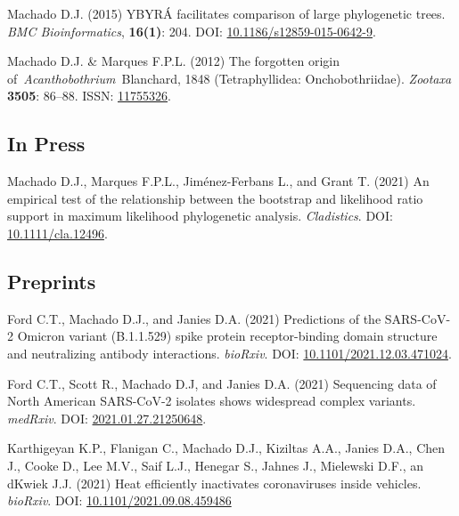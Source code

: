 {\begin{hangparas}{.25in}{1}

		Machado D.J. (2015) YBYRÁ facilitates comparison of large phylogenetic trees. \emph{BMC Bioinformatics}, \textbf{16(1)}: 204. DOI: \href{https://doi.org/10.1186/s12859-015-0642-9}{10.1186/s12859-015-0642-9}.


		Machado D.J. \& Marques F.P.L. (2012) The forgotten origin of~\emph{Acanthobothrium}~Blanchard, 1848 (Tetraphyllidea: Onchobothriidae). \emph{Zootaxa} \textbf{3505}: 86--88. ISSN: \href{http://www.mapress.com/zootaxa/2012/f/z03505p088f.pdf}{11755326}.

		\end{hangparas}
	}
        
\subsection{In Press}

	{
		\setlength{\parskip}{.5em}\renewcommand{\baselinestretch}{2.0}
		\begin{hangparas}{.25in}{1}
		
		
        Machado D.J., Marques F.P.L., Jiménez-Ferbans L., and Grant T. (2021) An empirical test of the relationship between the bootstrap and likelihood ratio support in maximum likelihood phylogenetic analysis. \textit{Cladistics}. DOI: \href{https://doi.org/10.1111/cla.12496}{10.1111/cla.12496}.

		\end{hangparas}
	}

\subsection{Preprints}

	{
		\setlength{\parskip}{.5em}\renewcommand{\baselinestretch}{2.0}
		\begin{hangparas}{.25in}{1}
		
		
		Ford C.T., Machado D.J., and Janies D.A. (2021) Predictions of the SARS-CoV-2 Omicron variant (B.1.1.529) spike protein receptor-binding domain structure and neutralizing antibody interactions. \textit{bioRxiv}. DOI: \href{https://doi.org/10.1101/2021.12.03.471024}{10.1101/2021.12.03.471024}.
		
		Ford C.T., Scott R.,  Machado D.J, and  Janies D.A. (2021) Sequencing data of North American SARS-CoV-2 isolates shows widespread complex variants. \textit{medRxiv}. DOI: \href{https://doi.org/10.1101/2021.01.27.21250648}{2021.01.27.21250648}.
		
		Karthigeyan K.P., Flanigan C., Machado D.J., Kiziltas A.A., Janies D.A., Chen J., Cooke D., Lee M.V., Saif L.J., Henegar S., Jahnes J., Mielewski D.F., an dKwiek J.J. (2021) Heat efficiently inactivates coronaviruses inside vehicles. \textit{bioRxiv}. DOI: \href{https://doi.org/10.1101/2021.09.08.459486}{10.1101/2021.09.08.459486}
		
		\end{hangparas}
	}